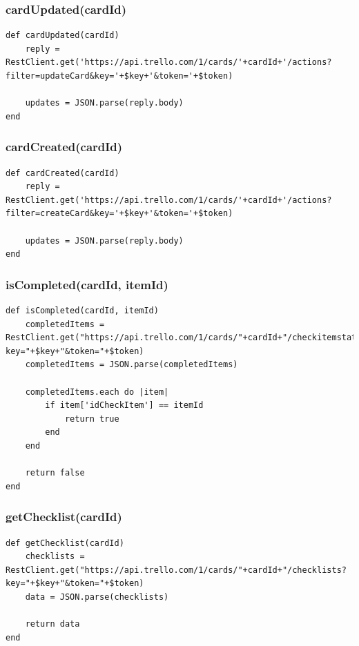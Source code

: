 \subsubsection{cardUpdated(cardId)}
\begin{lstlisting}[aboveskip=1\baselineskip, caption= cardUpdated(), label=listing053]
def cardUpdated(cardId)
	reply = RestClient.get('https://api.trello.com/1/cards/'+cardId+'/actions?filter=updateCard&key='+$key+'&token='+$token)

	updates = JSON.parse(reply.body)
end
\end{lstlisting}

\subsubsection{cardCreated(cardId)}
\begin{lstlisting}[aboveskip=1\baselineskip, caption= cardCreated(), label=listing054]
def cardCreated(cardId)
	reply = RestClient.get('https://api.trello.com/1/cards/'+cardId+'/actions?filter=createCard&key='+$key+'&token='+$token)

	updates = JSON.parse(reply.body)
end
\end{lstlisting}

\subsubsection{isCompleted(cardId, itemId)}
\begin{lstlisting}[aboveskip=1\baselineskip, caption= isCompleted(), label=listing055]
def isCompleted(cardId, itemId)
	completedItems = RestClient.get("https://api.trello.com/1/cards/"+cardId+"/checkitemstates?key="+$key+"&token="+$token)
	completedItems = JSON.parse(completedItems)

	completedItems.each do |item|
		if item['idCheckItem'] == itemId
			return true
		end
	end

	return false
end
\end{lstlisting}

\subsubsection{getChecklist(cardId)}
\begin{lstlisting}[aboveskip=1\baselineskip, caption= getChecklist(), label=listing056]
def getChecklist(cardId)
	checklists = RestClient.get("https://api.trello.com/1/cards/"+cardId+"/checklists?key="+$key+"&token="+$token)
	data = JSON.parse(checklists)

	return data  
end
\end{lstlisting}

